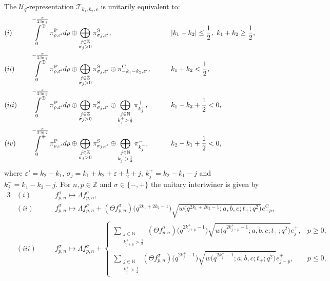 \documentclass[pdftex]{sigma}
\numberwithin{equation}{section}
\numberwithin{theorem}{section}
\numberwithin{proposition}{section}
\numberwithin{lemma}{section}
\numberwithin{corollary}{section}
\numberwithin{definition}{section}
\numberwithin{example}{section}
\numberwithin{remark}{section}
\numberwithin{note}{section}
\newcommand{\N}{\mathbb N}
\newcommand{\Z}{\mathbb Z}
\newcommand{\eps}{\varepsilon}
\newcommand{\dirint}[2]{\sideset{}{^\oplus}\int\limits_{#1\ }^{\ \ #2}}
\newcommand{\U}{\mathcal U}
\begin{document}
\begin{theorem} \label{thm:decompT1}
The $\U_q$-representation $\mathcal T_{k_1,k_2,\eps}$ is unitarily equivalent to:
\begin{alignat*}{4}
& (i)\quad && \dirint{0}{-\frac{\pi}{2 \ln q}} \pi^{\mathrm P}_{\rho,\eps'} d\rho \oplus \bigoplus_{\substack{j \in \Z \\ \sigma_j>0}} \pi^{\mathrm S}_{\sigma_j,\eps'},\qquad  &&  |k_1-k_2|\leq \frac12,\ k_1+k_2\geq \frac12,& \\
& (ii)\quad && \dirint{0}{-\frac{\pi}{2 \ln q}} \pi^{\mathrm P}_{\rho,\eps'} d\rho \oplus \bigoplus_{\substack{j \in \Z \\ \sigma_j>0}} \pi^{\mathrm S}_{\sigma_j,\eps'} \oplus \pi^{\mathrm C}_{-k_1-k_2,\eps'}, \qquad && k_1+k_2<\frac12,& \\
& (iii)\quad && \dirint{0}{-\frac{\pi}{2 \ln q}} \pi^{\mathrm P}_{\rho,\eps'} d\rho \oplus \bigoplus_{\substack{j \in \Z \\ \sigma_j>0}} \pi^{\mathrm S}_{\sigma_j,\eps'} \oplus \bigoplus_{\substack{j \in \N\\k_j^+>\frac12}} \pi^+_{k_j^+} , \qquad && k_1-k_2+\frac12<0,& \\
& (iv)\quad && \dirint{0}{-\frac{\pi}{2 \ln q}} \pi^{\mathrm P}_{\rho,\eps'} d\rho \oplus
\bigoplus_{\substack{j \in \Z \\ \sigma_j>0}} \pi^{\mathrm S}_{\sigma_j,\eps'} \oplus \bigoplus_{\substack{j \in \N\\k_j^->\frac12}} \pi^-_{k_j^-} , \qquad && k_2-k_1+\frac12<0,&
\end{alignat*}
where $\eps'=k_2-k_1$, $\sigma_j= k_1+k_2+\eps+\frac12+j$, $k_j^+=k_2-k_1-j$ and $k_j^-=k_1-k_2-j$. For $n,p \in \Z$ and $\sigma \in \{-,+\}$ the unitary intertwiner is given by
\begin{alignat*}{3}
& (i)\quad && f_{p,n}^\sigma \mapsto \Lambda f_{p,n}^\sigma,  & \\
& (ii) \quad && f_{p,n}^\sigma \mapsto \Lambda f_{p,n}^\sigma + (\Theta f_{p,n}^\sigma)\big(q^{2k_1+2k_2-1}\big)\sqrt{w\big(q^{2k_1+2k_2-1};a,b,c;t_+;q^2\big)} e_{-p}^{\mathrm C},  & \\
& (iii) \quad && f_{p,n}^\sigma \mapsto \Lambda f_{p,n}^\sigma +
\begin{cases}
\displaystyle \sum_{\substack{j \in \N\\k_{j+p}^+>\frac12}} (\Theta f_{p,n}^\sigma)\big(q^{2k_{j+p}^+-1}\big) \sqrt{w\big(q^{2k_{j+p}^+-1};a,b,c;t_+;q^2\big)} e_{j}^+, & p \geq 0,\\
\displaystyle \sum_{\substack{j \in \N\\k_{j}^+>\frac12}} (\Theta f_{p,n}^\sigma)\big(q^{2k_{j}^+-1}\big) \sqrt{w\big(q^{2k_{j}^+-1};a,b,c;t_+;q^2\big)} e_{j-p}^+, & p \leq 0,

\end{cases}
\end{alignat*}
\end{theorem}
\end{document}
